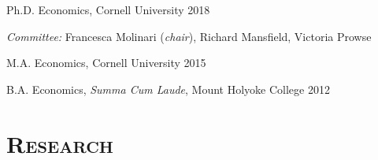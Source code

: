 \documentclass[10pt,letterpaper]{article}
\renewenvironment{itemize}{
  \begin{list}{}{
    \setlength{\leftmargin}{1.5em}
    \setlength{\itemsep}{0.25em}
    \setlength{\parskip}{0pt}
    \setlength{\parsep}{0.25em}
  }
}{
  \end{list}
}
\begin{document}
\begin{itemize}
 \setlength{\itemsep}{1pt}
  \setlength{\parskip}{0pt}
  \setlength{\parsep}{0pt}
	\item Ph.D. Economics, Cornell University \hfill{2018}

	\hspace{15mm} \textit{Committee:} Francesca Molinari ({\it chair}), Richard Mansfield, Victoria Prowse
  	\item M.A. Economics, Cornell University \hfill{2015}
	\item B.A. Economics, \textit{Summa Cum Laude}, Mount Holyoke College \hfill{2012}

\end{itemize}






\section*{\scshape Research}
%
%

%
%
\end{document}
